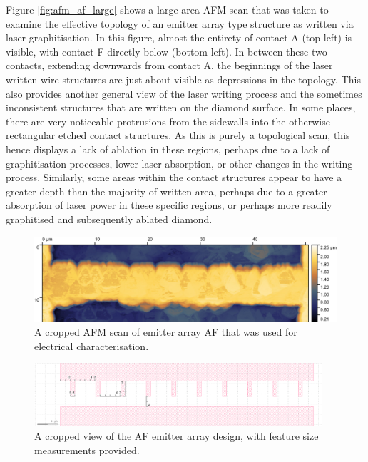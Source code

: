 \begin{refsection}
Figure \ref{fig:afm_af_large} shows a large area AFM scan that was taken to examine the effective topology of an emitter array type structure as written via laser graphitisation. In this figure, almost the entirety of contact A (top left) is visible, with contact F directly below (bottom left). In-between these two contacts, extending downwards from contact A, the beginnings of the laser written wire structures are just about visible as depressions in the topology. This also provides another general view of the laser writing process and the sometimes inconsistent structures that are written on the diamond surface. In some places, there are very noticeable protrusions from the sidewalls into the otherwise rectangular etched contact structures. As this is purely a topological scan, this hence displays a lack of ablation in these regions, perhaps due to a lack of graphitisation processes, lower laser absorption, or other changes in the writing process. Similarly, some areas within the contact structures appear to have a greater depth than the majority of written area, perhaps due to a greater absorption of laser power in these specific regions, or perhaps more readily graphitised and subsequently ablated diamond.

\begin{figure}[H]
    \centering
    \includegraphics[width=\textwidth]{Chapter7/Figs/Raster/af_cropped_emitters.jpg}
    \caption{A cropped AFM scan of emitter array AF that was used for electrical characterisation.}
    \label{fig:afm_af_crop}
\end{figure}

\begin{figure}[H]
    \centering
    \includegraphics[width=0.95\textwidth]{Chapter7/Figs/Raster/af_emitter_design1.png}
    \caption{A cropped view of the AF emitter array design, with feature size measurements provided.}
    \label{fig:afm_af_design}
\end{figure}


\end{refsection}
